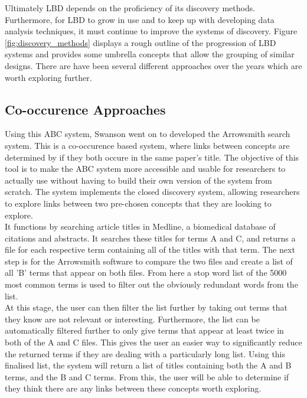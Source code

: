 \documentclass{l4proj}
\begin{document}
Ultimately LBD depends on the proficiency of its discovery methods. Furthermore, for LBD to grow in use and to keep up with developing data analysis techniques, it must continue to improve the systems of discovery. Figure \ref{fig:discovery_methods} displays a rough outline of the progression of LBD systems and provides some umbrella concepts that allow the grouping of similar designs. There are have been several different approaches over the years which are worth exploring further. \\

\subsection{Co-occurence Approaches}

Using this ABC system, Swanson went on to developed the Arrowsmith search system. This is a co-occurence based system, where links between concepts are determined by if they both occure in the same paper's title. The objective of this tool is to make the ABC system more accessible and usable for researchers to actually use without having to build their own version of the system from scratch. The system implements the closed discovery system, allowing researchers to explore links between two pre-chosen concepts that they are looking to explore. \\

It functions by searching article titles in Medline, a biomedical database of citations and abstracts. It searches these titles for terms A and C, and returns a file for each respective term containing all of the titles with that term. The next step is for the Arrowsmith software to compare the two files and create a list of all 'B' terms that appear on both files. From here a stop word list of the 5000 most common terms is used to filter out the obviously redundant words from the list. \\

At this stage, the user can then filter the list further by taking out terms that they know are not relevant or interesting. Furthermore, the list can be automatically filtered further to only give terms that appear at least twice in both of the A and C files. This gives the user an easier way to significantly reduce the returned terms if they are dealing with a particularly long list. Using this finalised list, the system will return a list of titles containing both the A and B terms, and the B and C terms. From this, the user will be able to determine if they think there are any links between these concepts worth exploring. \\
\end{document}
